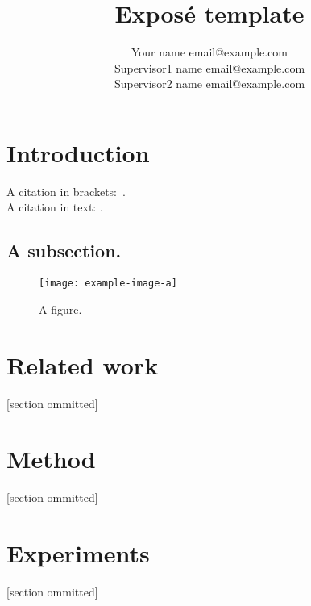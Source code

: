 \documentclass[akbc,twoside,11pt,lettersize]{article}
\begin{document}
\title{Exposé template}

\author{\name Your name \email email@example.com \\
\AND
\name Supervisor1 name \email email@example.com \\
\AND
\name Supervisor2 name  \email email@example.com}

\maketitle


\section{Introduction}
\label{Introduction}

    A citation in brackets:~\cite{lecun2015deep}. \\
    A citation in text: \citet{lecun2015deep}.
    
    \subsection{A subsection.}

    \begin{figure}[h]
        \centering
        \texttt{[image: example-image-a]}
    \caption{A figure.}
    \label{figure1}
    \end{figure}

\section{Related work}
\label{related_work}

    [section ommitted]

\section{Method}
\label{method}

    [section ommitted]

\section{Experiments}
\label{experiments}
 
    [section ommitted]



\end{document}
